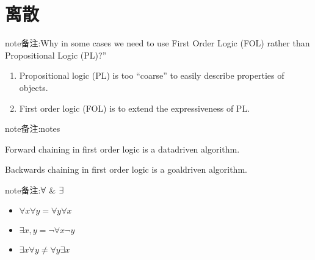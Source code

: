 \documentclass[letterpaper,10pt,english]{sphinxmanual}
\begin{document}
\section{离散}
\label{\detokenize{AI/main:id12}}
\begin{sphinxadmonition}{note}{备注:}{Why in some cases we need to use First Order Logic (FOL) rather than Propositional Logic (PL)?”}
\begin{enumerate}
%
\item {} 
\sphinxAtStartPar
Propositional logic (PL) is too “coarse” to easily describe properties of objects.

\item {} 
\sphinxAtStartPar
First order logic (FOL) is to extend the expressiveness of PL.

\end{enumerate}
\end{sphinxadmonition}

\begin{sphinxadmonition}{note}{备注:}{notes}

\begin{DUlineblock}{0em}
\item[] Forward chaining in first order logic is a data\sphinxhyphen{}driven algorithm.
\item[] Backwards chaining in first order logic is a goal\sphinxhyphen{}driven algorithm.
\end{DUlineblock}
\end{sphinxadmonition}

\begin{sphinxadmonition}{note}{备注:}{\protect\(\forall\protect\) \& \protect\(\exists\protect\)}
\begin{itemize}
\item {} 
\sphinxAtStartPar
\(\forall x\forall y=\forall y\forall x\)

\item {} 
\sphinxAtStartPar
\(\exists x, y = \neg \forall x\neg y\)

\item {} 
\sphinxAtStartPar
\(\exists x\forall y\neq \forall y \exists x\)

\end{itemize}
\end{sphinxadmonition}
\end{document}
